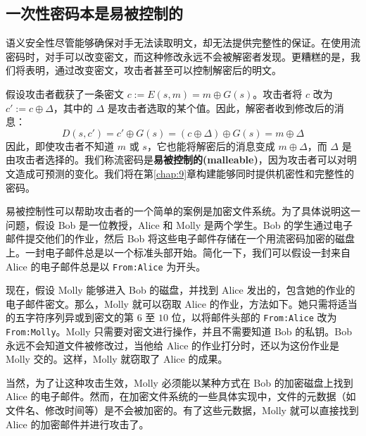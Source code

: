 \subsection{一次性密码本是易被控制的}

语义安全性尽管能够确保对手无法读取明文，却无法提供完整性的保证。在使用流密码时，对手可以改变密文，而这种修改永远不会被解密者发现。更糟糕的是，我们将表明，通过改变密文，攻击者甚至可以控制解密后的明文。

假设攻击者截获了一条密文 $c:=E(s,m)=m\oplus G(s)$。攻击者将 $c$ 改为 $c':=c\oplus\Delta$，其中的 $\Delta$ 是攻击者选取的某个值。因此，解密者收到修改后的消息：
\[
D(s,c')
=c'\oplus G(s)
=(c\oplus\Delta)\oplus G(s)
=m\oplus\Delta
\]
因此，即使攻击者不知道 $m$ 或 $s$，它也能将解密后的消息变成 $m\oplus\Delta$，而 $\Delta$ 是由攻击者选择的。我们称流密码是\textbf{易被控制的(malleable)}，因为攻击者可以对明文造成可预测的变化。我们将在第\ref{chap:9}章构建能够同时提供机密性和完整性的密码。

易被控制性可以帮助攻击者的一个简单的案例是加密文件系统。为了具体说明这一问题，假设 Bob 是一位教授，Alice 和 Molly 是两个学生。Bob 的学生通过电子邮件提交他们的作业，然后 Bob 将这些电子邮件存储在一个用流密码加密的磁盘上。一封电子邮件总是以一个标准头部开始。简化一下，我们可以假设一封来自 Alice 的电子邮件总是以 \texttt{From:Alice} 为开头。

现在，假设 Molly 能够进入 Bob 的磁盘，并找到 Alice 发出的，包含她的作业的电子邮件密文。那么，Molly 就可以窃取 Alice 的作业，方法如下。她只需将适当的五字符序列异或到密文的第 $6$ 至 $10$ 位，以将邮件头部的 \texttt{From:Alice} 改为 \texttt{From:Molly}。Molly 只需要对密文进行操作，并且不需要知道 Bob 的私钥。Bob 永远不会知道文件被修改过，当他给 Alice 的作业打分时，还以为这份作业是 Molly 交的。这样，Molly 就窃取了 Alice 的成果。

当然，为了让这种攻击生效，Molly 必须能以某种方式在 Bob 的加密磁盘上找到 Alice 的电子邮件。然而，在加密文件系统的一些具体实现中，文件的元数据（如文件名、修改时间等）是不会被加密的。有了这些元数据，Molly 就可以直接找到 Alice 的加密邮件并进行攻击了。